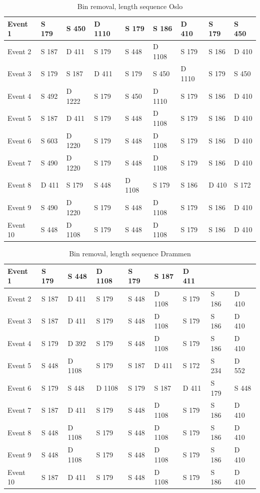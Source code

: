 \begin{table}[H]
\centering
\caption{Bin removal, length sequence Oslo}
\label{tab:BRSquenceOslo}
\begin{tabular}{|l|l|l|l|l|l|l|l|l|}
\hline
Event 1  & S 179   & S 450  & D 1110 & S 179  & S 186  & D 410  & S 179 & S 450 \\ \hline
Event 2  & S   187 & D 411  & S 179  & S 448  & D 1108 & S 179  & S 186 & D 410 \\ \hline
Event 3  & S   179 & S 187  & D 411  & S 179  & S 450  & D 1110 & S 179 & S 450 \\ \hline
Event 4  & S   492 & D 1222 & S 179  & S 450  & D 1110 & S 179  & S 186 & D 410 \\ \hline
Event 5  & S   187 & D 411  & S 179  & S 448  & D 1108 & S 179  & S 186 & D 410 \\ \hline
Event 6  & S 603   & D 1220 & S 179  & S 448  & D 1108 & S 179  & S 186 & D 410 \\ \hline
Event 7  & S   490 & D 1220 & S 179  & S 448  & D 1108 & S 179  & S 186 & D 410 \\ \hline
Event 8  & D   411 & S 179  & S 448  & D 1108 & S 179  & S 186  & D 410 & S 172 \\ \hline
Event 9  & S   490 & D 1220 & S 179  & S 448  & D 1108 & S 179  & S 186 & D 410 \\ \hline
Event 10 & S   448 & D 1108 & S 179  & S 448  & D 1108 & S 179  & S 186 & D 410 \\ \hline
\end{tabular}
\end{table}


\begin{table}[H]
\centering
\caption{Bin removal, length sequence Drammen}
\label{tab:BRSquenceDrammen}
\begin{tabular}{|l|l|l|l|l|l|l|l|l|}
\hline
Event 1  & S 179   & S 448  & D 1108 & S 179 & S 187  & D 411 &       &       \\ \hline
Event 2  & S   187 & D 411  & S 179  & S 448 & D 1108 & S 179 & S 186 & D 410 \\ \hline
Event 3  & S   187 & D 411  & S 179  & S 448 & D 1108 & S 179 & S 186 & D 410 \\ \hline
Event 4  & S   179 & D 392  & S 179  & S 448 & D 1108 & S 179 & S 186 & D 410 \\ \hline
Event 5  & S   448 & D 1108 & S 179  & S 187 & D 411  & S 172 & S 234 & D 552 \\ \hline
Event 6  & S 179   & S 448  & D 1108 & S 179 & S 187  & D 411 & S 179 & S 448 \\ \hline
Event 7  & S   187 & D 411  & S 179  & S 448 & D 1108 & S 179 & S 186 & D 410 \\ \hline
Event 8  & S   448 & D 1108 & S 179  & S 448 & D 1108 & S 179 & S 186 & D 410 \\ \hline
Event 9  & S   448 & D 1108 & S 179  & S 448 & D 1108 & S 179 & S 186 & D 410 \\ \hline
Event 10 & S   187 & D 411  & S 179  & S 448 & D 1108 & S 179 & S 186 & D 410 \\ \hline
\end{tabular}
\end{table}
